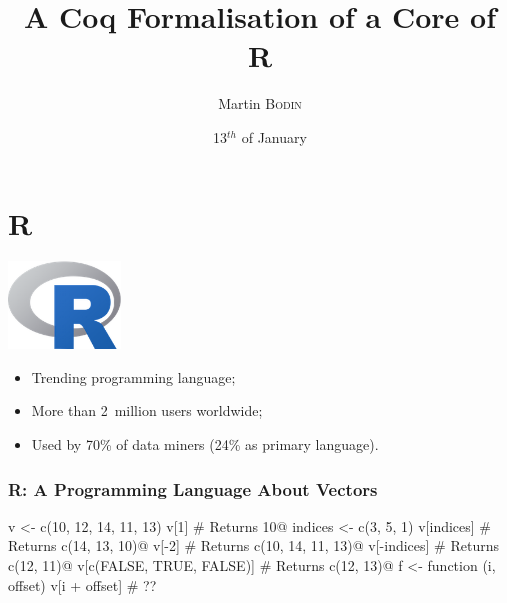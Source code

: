 \documentclass{beamer}
\title{A Coq Formalisation of a Core of R}
\author{Martin \textsc{Bodin}}
\institute{CMM}
\date{13\(^{th}\) of January}
\begin{document}
\begin{frame}
    \titlepage
\end{frame}

\section{R}

\begin{frame}
    \begin{center}
        \includegraphics[width=3cm]{images/Rlogo.png}
    \end{center}

    \vfill

    \begin{itemize}
        \item Trending programming language;
        \item More than 2~million users worldwide;
        \item Used by 70\% of data miners (24\% as primary language).
    \end{itemize}
\end{frame}


\begin{frame}[fragile]
    \frametitle{R: A Programming Language About Vectors}

\begin{Rcode}
v <- c(10, 12, 14, 11, 13)
v[1]                          # Returns 10@\pause@
indices <- c(3, 5, 1)
v[indices]                    # Returns c(14, 13, 10)@\pause@
v[-2]                         # Returns c(10, 14, 11, 13)@\pause@
v[-indices]                   # Returns c(12, 11)@\pause@
v[c(FALSE, TRUE, FALSE)]      # Returns c(12, 13)@\pause@
f <- function (i, offset)
       v[i + offset]          # ??
\end{Rcode}

\end{frame}
\end{document}
